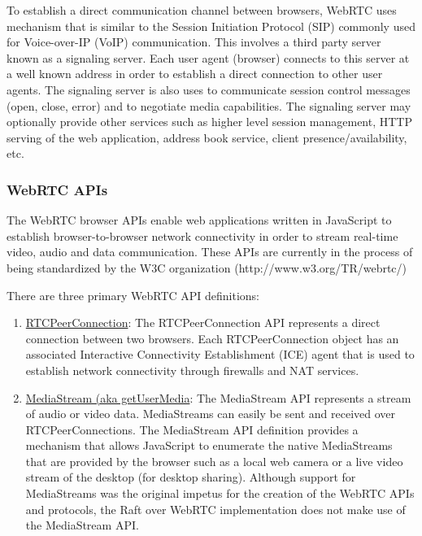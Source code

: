 \documentclass[9pt]{extarticle}
\begin{document}
\begin{multicols}{2}
To establish a direct communication channel between browsers, WebRTC
uses mechanism that is similar to the Session Initiation Protocol
(SIP) commonly used for Voice-over-IP (VoIP) communication. This
involves a third party server known as a signaling server. Each user
agent (browser) connects to this server at a well known address in
order to establish a direct connection to other user agents. The
signaling server is also uses to communicate session control messages
(open, close, error) and to negotiate media capabilities. The signaling
server may optionally provide other services such as higher level
session management, HTTP serving of the web application, address book
service, client presence/availability, etc.

\subsubsection{WebRTC APIs}

The WebRTC browser APIs enable web applications written in JavaScript
to establish browser-to-browser network connectivity in order to
stream real-time video, audio and data communication. These APIs are
currently in the process of being standardized by the W3C organization
(http://www.w3.org/TR/webrtc/) %

There are three primary WebRTC API definitions:

\begin{enumerate}
\item \href{http://www.w3.org/TR/webrtc/\#rtcpeerconnection-interface}{RTCPeerConnection}: The RTCPeerConnection API represents a direct connection between two browsers. Each RTCPeerConnection object has an associated Interactive Connectivity Establishment (ICE) agent that is used to establish network connectivity through firewalls and NAT services.

\item \href{http://www.w3.org/TR/webrtc/\#media-stream-api-extensions-for-network-use}{MediaStream (aka getUserMedia}: The MediaStream API represents a stream of audio or video data.  MediaStreams can easily be sent and received over RTCPeerConnections. The MediaStream API definition provides a mechanism that allows JavaScript to enumerate the native MediaStreams that are provided by the browser such as a local web camera or a live video stream of the desktop (for desktop sharing).  Although support for MediaStreams was the original impetus for the creation of the WebRTC APIs and protocols, the Raft over WebRTC implementation does not make use of the MediaStream API.


\end{enumerate}
\end{multicols}
\end{document}
